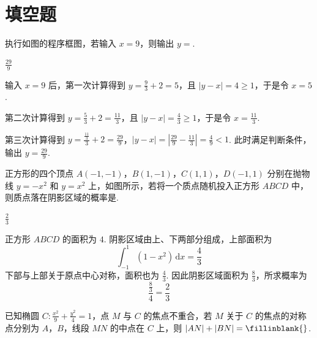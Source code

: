 \section{填空题}

\begin{problem}
执行如图的程序框图，若输入 \(x = 9\)，则输出 \(y =\)\fillinblank{}.
\end{problem}

\begin{answer}
\(\frac{29}{9}\)
\end{answer}

\begin{solution}
输入 \(x=9\) 后，第一次计算得到 \(y=\frac93+2=5\)，且 \(|y-x|=4\geqslant1\)，于是令 \(x=5\).

第二次计算得到 \(y=\frac53+2=\frac{11}{3}\)，且 \(|y-x|=\frac43\geqslant1\)，于是令 \(x=\frac{11}{3}\).

第三次计算得到
\(y=\frac{\frac{11}{3}}{3}+2=\frac{29}{9}\)，\(|y-x|=\left|\frac{29}{9}-\frac{11}{3}\right|=\frac49<1\).
此时满足判断条件，输出 \(y=\frac{29}{9}\).
\end{solution}

\begin{problem}
正方形的四个顶点 \(A(-1, -1)\)，\(B(1, -1)\)，\(C(1, 1)\)，\(D(-1, 1)\) 分别在抛物线 \(y = -x^2\) 和 \(y = x^2\) 上，如图所示，若将一个质点随机投入正方形 \(ABCD\) 中，则质点落在阴影区域的概率是\fillinblank{}.
\end{problem}

\begin{answer}
\(\frac{2}{3}\)
\end{answer}

\begin{solution}
正方形 \(ABCD\) 的面积为 \(4\). 阴影区域由上、下两部分组成，上部面积为
\[
\int_{-1}^{1}(1-x^2)\,\mathrm{d}x=\frac43
\]
下部与上部关于原点中心对称，面积也为 \(\frac43\). 因此阴影区域面积为 \(\frac83\)，所求概率为
\[
\frac{\frac83}{4}=\frac23
\]
\end{solution}

\begin{problem}
已知椭圆 \(C: \frac{x^2}{9} + \frac{y^2}{4} = 1\)，点 \(M\) 与 \(C\) 的焦点不重合，若 \(M\) 关于 \(C\) 的焦点的对称点分别为 \(A\)，\(B\)，线段 \(MN\) 的中点在 \(C\) 上，则 \(|AN| + |BN| =\fillinblank{}\).
\end{problem}

